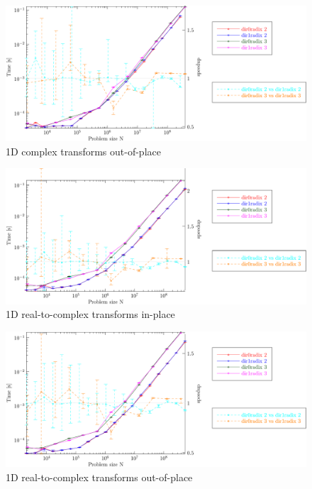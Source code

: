 \documentclass[12pt]{article}
\begin{document}
\centering
\begin{figure}[htbp]
   \includegraphics[width=\textwidth]{1d_c2coutofplace_double.pdf}
   \caption{1D complex transforms out-of-place}
\end{figure}

\centering
\begin{figure}[htbp]
   \includegraphics[width=\textwidth]{1d_r2cinplace_double.pdf}
   \caption{1D real-to-complex transforms in-place}
\end{figure}
\clearpage

\centering
\begin{figure}[htbp]
   \includegraphics[width=\textwidth]{1d_r2coutofplace_double.pdf}
   \caption{1D real-to-complex transforms out-of-place}
\end{figure}
\end{document}
